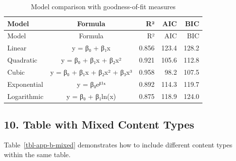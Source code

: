 \documentclass[
  letterpaper,
  oneside,
  openany]{MastersDoctoralThesis}
\theoremstyle{plain}
\theoremstyle{remark}
\begin{document}
\begin{longtable}[]{@{}lcrrr@{}}
\caption{Model comparison with goodness-of-fit
measures}\label{tbl-app-b-r-kable}\tabularnewline
\toprule\noalign{}
Model & Formula & R² & AIC & BIC \\
\midrule\noalign{}
\endfirsthead
\toprule\noalign{}
Model & Formula & R² & AIC & BIC \\
\midrule\noalign{}
\endhead
\bottomrule\noalign{}
\endlastfoot
Linear & y = β₀ + β₁x & 0.856 & 123.4 & 128.2 \\
Quadratic & y = β₀ + β₁x + β₂x² & 0.921 & 105.6 & 112.8 \\
Cubic & y = β₀ + β₁x + β₂x² + β₃x³ & 0.958 & 98.2 & 107.5 \\
Exponential & y = β₀eᵝ¹ˣ & 0.892 & 114.3 & 119.7 \\
Logarithmic & y = β₀ + β₁ln(x) & 0.875 & 118.9 & 124.0 \\
\end{longtable}

\subsection{10. Table with Mixed Content
Types}\label{sec-app-b-mixed-table}

Table~\ref{tbl-app-b-mixed} demonstrates how to include different
content types within the same table.
\end{document}
